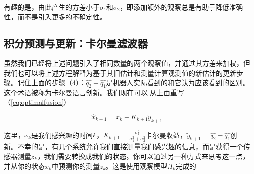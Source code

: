 有趣的是，由此产生的方差小于$\sigma_1$和$\sigma_2$，即添加额外的观察总是有助于降低准确性，而不是引入更多的不确定性。


\subsection{积分预测与更新：卡尔曼滤波器}
虽然我们已经将上述问题引入了相同数量的两个观察值，并通过其方差来加权，但我们也可以将上述方程解释为基于其旧估计和测量计算观测值的新估计的更新步骤。记住上面的步骤（4）：$\hat{q_2}-\hat{q_1}$是机器人实际看到的和它认为应该看到的区别。这个术语被称为卡尔曼语言创新。我们现在可以
从上面重写（\ref{eq:optimalfusion}）

\begin{equation}
\hat{x}_{k+1}=\hat{x}_k+K_{k+1}\tilde{y}_{k+1}
\end{equation}


这里，$\hat{x}_k$是我们感兴趣的时间$k$，$K_{k+1}=\frac{\sigma_1^2}{\sigma_1^2+\sigma_2^2}$卡尔曼收益，$\tilde{y}_{k+1}=\hat{q_2}-\hat{q_1}$创新。不幸的是，有几个系统允许我们直接测量我们感兴趣的信息，而是获得一个传感器测量$z_k$，我们需要转换成我们的状态。你可以通过另一种方式来思考这一点，并从你的状态$x_k$中预测你的测量$z_k$。这是使用观察模型$H_k$完成的

